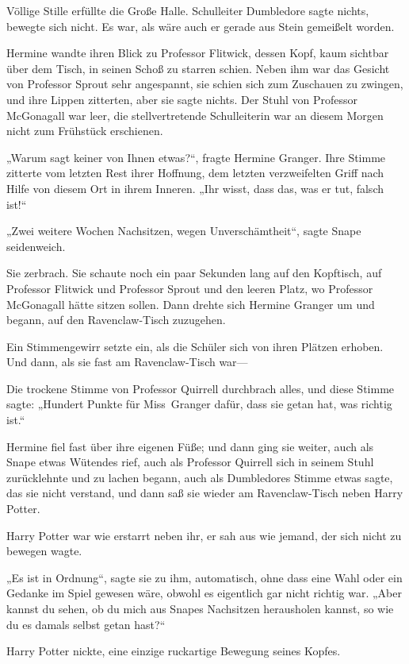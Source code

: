 {Völlige Stille erfüllte die Große Halle. Schulleiter Dumbledore sagte nichts, bewegte sich nicht. Es war, als wäre auch er gerade aus Stein gemeißelt worden.

Hermine wandte ihren Blick zu Professor Flitwick, dessen Kopf, kaum sichtbar über dem Tisch, in seinen Schoß zu starren schien. Neben ihm war das Gesicht von Professor Sprout sehr angespannt, sie schien sich zum Zuschauen zu zwingen, und ihre Lippen zitterten, aber sie sagte nichts. Der Stuhl von Professor McGonagall war leer, die stellvertretende Schulleiterin war an diesem Morgen nicht zum Frühstück erschienen.

„Warum sagt keiner von Ihnen etwas?“, fragte Hermine Granger. Ihre Stimme zitterte vom letzten Rest ihrer Hoffnung, dem letzten verzweifelten Griff nach Hilfe von diesem Ort in ihrem Inneren. „Ihr wisst, dass das, was er tut, falsch ist!“

„Zwei weitere Wochen Nachsitzen, wegen Unverschämtheit“, sagte Snape seidenweich.

Sie zerbrach. Sie schaute noch ein paar Sekunden lang auf den Kopftisch, auf Professor Flitwick und Professor Sprout und den leeren Platz, wo Professor McGonagall hätte sitzen sollen. Dann drehte sich Hermine Granger um und begann, auf den Ravenclaw-Tisch zuzugehen.

Ein Stimmengewirr setzte ein, als die Schüler sich von ihren Plätzen erhoben. Und dann, als sie fast am Ravenclaw-Tisch war—

Die trockene Stimme von Professor Quirrell durchbrach alles, und diese Stimme sagte: „Hundert Punkte für Miss~Granger dafür, dass sie getan hat, was richtig ist.“

Hermine fiel fast über ihre eigenen Füße; und dann ging sie weiter, auch als Snape etwas Wütendes rief, auch als Professor Quirrell sich in seinem Stuhl zurücklehnte und zu lachen begann, auch als Dumbledores Stimme etwas sagte, das sie nicht verstand, und dann saß sie wieder am Ravenclaw-Tisch neben Harry Potter.

Harry Potter war wie erstarrt neben ihr, er sah aus wie jemand, der sich nicht zu bewegen wagte.

„Es ist in Ordnung“, sagte sie zu ihm, automatisch, ohne dass eine Wahl oder ein Gedanke im Spiel gewesen wäre, obwohl es eigentlich gar nicht richtig war. „Aber kannst du sehen, ob du mich aus Snapes Nachsitzen herausholen kannst, so wie du es damals selbst getan hast?“

Harry Potter nickte, eine einzige ruckartige Bewegung seines Kopfes.

}
